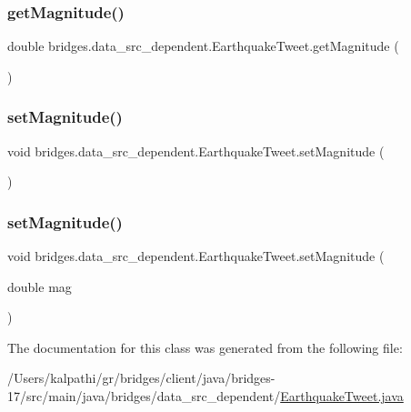 \subsubsection{\texorpdfstring{get\+Magnitude()}{getMagnitude()}}
{\footnotesize\ttfamily double bridges.\+data\+\_\+src\+\_\+dependent.\+Earthquake\+Tweet.\+get\+Magnitude (\begin{DoxyParamCaption}{ }\end{DoxyParamCaption})}

\mbox{\label{classbridges_1_1data__src__dependent_1_1_earthquake_tweet_a49880f314eee430098ca347cd07ff470}} 
\subsubsection{\texorpdfstring{set\+Magnitude()}{setMagnitude()}\hspace{0.1cm}{\footnotesize\ttfamily [1/2]}}
{\footnotesize\ttfamily void bridges.\+data\+\_\+src\+\_\+dependent.\+Earthquake\+Tweet.\+set\+Magnitude (\begin{DoxyParamCaption}{ }\end{DoxyParamCaption})}

\mbox{\label{classbridges_1_1data__src__dependent_1_1_earthquake_tweet_a763d8a261a563e66af95c5a97850ecc0}} 
\subsubsection{\texorpdfstring{set\+Magnitude()}{setMagnitude()}\hspace{0.1cm}{\footnotesize\ttfamily [2/2]}}
{\footnotesize\ttfamily void bridges.\+data\+\_\+src\+\_\+dependent.\+Earthquake\+Tweet.\+set\+Magnitude (\begin{DoxyParamCaption}\item[{double}]{mag }\end{DoxyParamCaption})}



The documentation for this class was generated from the following file\+:\begin{DoxyCompactItemize}
\item 
/\+Users/kalpathi/gr/bridges/client/java/bridges-\/17/src/main/java/bridges/data\+\_\+src\+\_\+dependent/\mbox{\hyperlink{_earthquake_tweet_8java}{Earthquake\+Tweet.\+java}}\end{DoxyCompactItemize}
